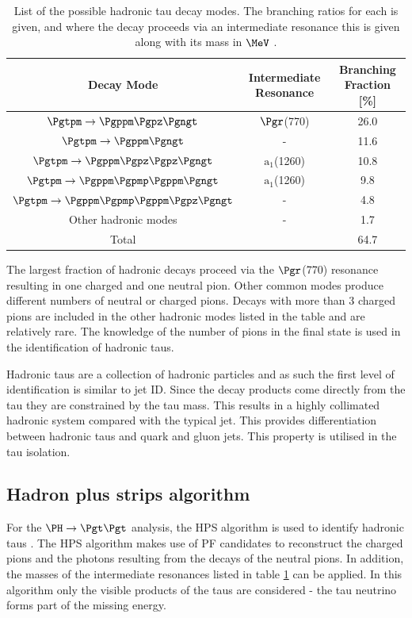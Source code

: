 \begin{table}[bth]
\begin{tabular}{|c|c|c|}
\hline
Decay Mode & Intermediate Resonance & Branching Fraction [\%] \\
\hline
\hline
$\Pgtpm\to\Pgppm\Pgpz\Pgngt$ & $\Pgr$(770) & 26.0 \\
\hline
$\Pgtpm\to\Pgppm\Pgngt$ & -  & 11.6 \\
\hline
$\Pgtpm\to\Pgppm\Pgpz\Pgpz\Pgngt$ & $\text{a}_{1}$(1260) & 10.8 \\
\hline
$\Pgtpm\to\Pgppm\Pgpmp\Pgppm\Pgngt$ & $\text{a}_{1}$(1260) & 9.8 \\
\hline
$\Pgtpm\to\Pgppm\Pgpmp\Pgppm\Pgpz\Pgngt$ & -  & 4.8 \\
\hline
Other hadronic modes & - & 1.7 \\
\hline
\hline
Total & &  64.7 \\
\hline
\end{tabular}
\caption[List of the possible hadronic tau decay modes.]{List of the possible hadronic tau decay modes. The branching ratios for
each is given, and where the decay proceeds via an intermediate resonance this
is given along with its mass in $\MeV$ \cite{PDG}.}
\label{tab:hadronictaus}
\end{table}

The largest fraction of hadronic decays proceed via the $\Pgr$(770) resonance
resulting in one charged and one neutral pion. Other common modes produce
different numbers of neutral or charged pions. Decays with more than 3 charged
pions are included in the other hadronic modes listed in the table and are
relatively rare. The knowledge of the number of pions in the final state is used in the
identification of hadronic taus.

Hadronic taus are a collection of hadronic particles and as such the first level
of identification is similar to jet ID. 
Since the decay products come directly from the tau they are constrained by the
tau mass. This results in a highly collimated hadronic system compared with the
typical jet. This provides differentiation between hadronic taus and
quark and gluon jets. This property is utilised in the tau isolation.

\subsection{Hadron plus strips algorithm}
\label{sec:hps}

For the $\PH \to \Pgt\Pgt$ analysis, the \ac{HPS} algorithm is used to identify
hadronic taus \cite{CMS-PAS-TAU-11-001}. The \ac{HPS} algorithm makes use of \ac{PF} candidates to reconstruct the
charged pions and the photons resulting from the decays of the neutral pions. In
addition, the masses of the intermediate resonances listed in table \ref{tab:hadronictaus} can be
applied. In this algorithm only the visible products of the taus are considered
- the tau neutrino forms part of the missing energy.

